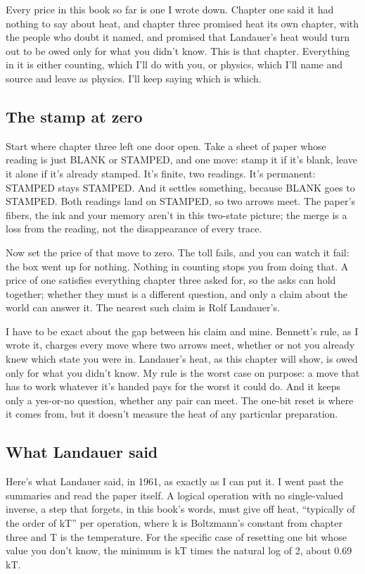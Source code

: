 \documentclass[11pt,twoside]{article}
\theoremstyle{thielethm}
\theoremstyle{thieledef}
\theoremstyle{thieledef}
\theoremstyle{thieledef}
\theoremstyle{thielethm}
\theoremstyle{thieleobs}
\theoremstyle{thielethm}
\begin{document}
Every price in this book so far is one I wrote down. Chapter one said it had nothing to say about heat, and chapter three promised heat its own chapter, with the people who doubt it named, and promised that Landauer's heat would turn out to be owed only for what you didn't know. This is that chapter. Everything in it is either counting, which I'll do with you, or physics, which I'll name and source and leave as physics. I'll keep saying which is which.

\subsection{The stamp at zero}

Start where chapter three left one door open. Take a sheet of paper whose reading is just BLANK or STAMPED, and one move: stamp it if it's blank, leave it alone if it's already stamped. It's finite, two readings. It's permanent: STAMPED stays STAMPED. And it settles something, because BLANK goes to STAMPED. Both readings land on STAMPED, so two arrows meet. The paper's fibers, the ink and your memory aren't in this two-state picture; the merge is a loss from the reading, not the disappearance of every trace.

Now set the price of that move to zero. The toll fails, and you can watch it fail: the box went up for nothing. Nothing in counting stops you from doing that. A price of one satisfies everything chapter three asked for, so the asks can hold together; whether they must is a different question, and only a claim about the world can answer it. The nearest such claim is Rolf Landauer's.

I have to be exact about the gap between his claim and mine. Bennett's rule, as I wrote it, charges every move where two arrows meet, whether or not you already knew which state you were in. Landauer's heat, as this chapter will show, is owed only for what you didn't know. My rule is the worst case on purpose: a move that has to work whatever it's handed pays for the worst it could do. And it keeps only a yes-or-no question, whether any pair can meet. The one-bit reset is where it comes from, but it doesn't measure the heat of any particular preparation.

\subsection{What Landauer said}

Here's what Landauer said, in 1961, as exactly as I can put it. I went past the summaries and read the paper itself. A logical operation with no single-valued inverse, a step that forgets, in this book's words, must give off heat, ``typically of the order of kT'' per operation, where k is Boltzmann's constant from chapter three and T is the temperature. For the specific case of resetting one bit whose value you don't know, the minimum is kT times the natural log of 2, about 0.69 kT.
\end{document}
